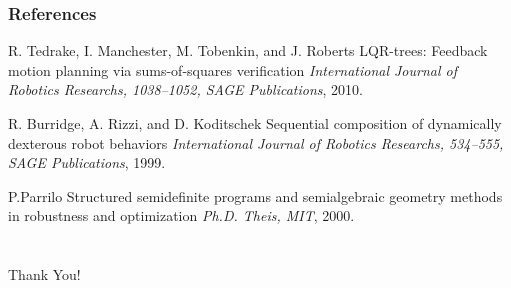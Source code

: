 \documentclass{beamer}
\begin{document}
\begin{frame}
\frametitle{References}
\footnotesize{
\begin{thebibliography}{99} %


 R. Tedrake, I. Manchester, M. Tobenkin, and J. Roberts
\newblock LQR-trees: Feedback motion planning via sums-of-squares verification
\newblock \emph{International Journal of Robotics Researchs, 1038--1052, SAGE Publications}, 2010.


 R. Burridge, A. Rizzi, and D. Koditschek
\newblock Sequential composition of dynamically dexterous robot behaviors
\newblock \emph{International Journal of Robotics Researchs, 534--555, SAGE Publications}, 1999.


 P.Parrilo
\newblock Structured semidefinite programs and semialgebraic geometry methods in robustness and optimization
\newblock \emph{Ph.D. Theis, MIT}, 2000.


\end{thebibliography}
}
\end{frame}

\section{}
\begin{frame}
\begin{center}
\Huge {Thank You!}
\end{center}
\end{frame}

\end{document}
